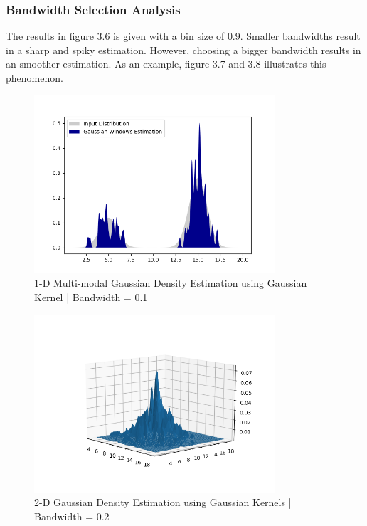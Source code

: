 \documentclass[12pt]{article}
\numberwithin{equation}{section}
\numberwithin{table}{section}
\numberwithin{figure}{section}
\begin{document}
\subsubsection*{Bandwidth Selection Analysis}
The results in figure 3.6 is given with a bin size of $0.9$. Smaller bandwidths result in a sharp and spiky estimation. However, choosing a bigger bandwidth results in an smoother estimation. As an example, figure 3.7 and 3.8 illustrates this phenomenon.
	\begin{figure}[!h]\centering
	\includegraphics[width=0.8\textwidth]{3_b_3.PNG}
	\caption{1-D Multi-modal Gaussian Density Estimation using Gaussian Kernel | Bandwidth = 0.1}
	\label{pl1}
\end{figure}

	\begin{figure}[!h]\centering
	\includegraphics[width=0.8\textwidth]{3_b_4.PNG}
	\caption{2-D Gaussian Density Estimation using Gaussian Kernels | Bandwidth = 0.2}
	\label{pl1}
\end{figure}
\end{document}
